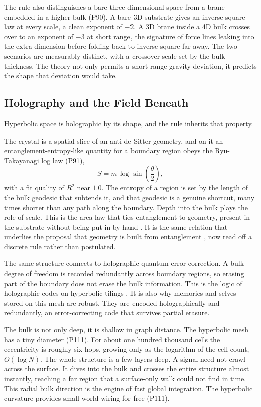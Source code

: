 The rule also distinguishes a bare three-dimensional space from a brane embedded in a higher bulk (P90). A bare 3D substrate gives an inverse-square law at every scale, a clean exponent of $-2$. A 3D brane inside a 4D bulk crosses over to an exponent of $-3$ at short range, the signature of force lines leaking into the extra dimension before folding back to inverse-square far away. The two scenarios are measurably distinct, with a crossover scale set by the bulk thickness. The theory not only permits a short-range gravity deviation, it predicts the shape that deviation would take.

\subsection{Holography and the Field Beneath}

Hyperbolic space is holographic by its shape, and the rule inherits that property.

The crystal is a spatial slice of an anti-de Sitter geometry, and on it an entanglement-entropy-like quantity for a boundary region obeys the Ryu-Takayanagi log law (P91),
\begin{equation}
S = m \,\log \sin\!\left(\frac{\theta}{2}\right),
\end{equation}
with a fit quality of $R^2$ near $1.0$. The entropy of a region is set by the length of the bulk geodesic that subtends it, and that geodesic is a genuine shortcut, many times shorter than any path along the boundary. Depth into the bulk plays the role of scale. This is the area law that ties entanglement to geometry, present in the substrate without being put in by hand \cite{ryu2006,maldacena1998}. It is the same relation that underlies the proposal that geometry is built from entanglement \cite{vanraamsdonk2010}, now read off a discrete rule rather than postulated.

The same structure connects to holographic quantum error correction. A bulk degree of freedom is recorded redundantly across boundary regions, so erasing part of the boundary does not erase the bulk information. This is the logic of holographic codes on hyperbolic tilings \cite{pastawski2015,jahn2021}. It is also why memories and selves stored on this mesh are robust. They are encoded holographically and redundantly, an error-correcting code that survives partial erasure.

The bulk is not only deep, it is shallow in graph distance. The hyperbolic mesh has a tiny diameter (P111). For about one hundred thousand cells the eccentricity is roughly six hops, growing only as the logarithm of the cell count, $O(\log N)$. The whole structure is a few layers deep. A signal need not crawl across the surface. It dives into the bulk and crosses the entire structure almost instantly, reaching a far region that a surface-only walk could not find in time. This radial bulk direction is the engine of fast global integration. The hyperbolic curvature provides small-world wiring for free (P111).

